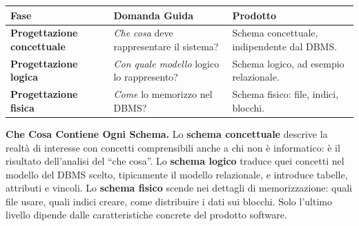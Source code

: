 \documentclass[12pt]{extarticle}
\begin{document}
\begin{center}
\small
\begin{tabular}{@{}L{5.3cm}L{4.7cm}L{4.55cm}@{}}
    \toprule
    \textbf{Fase} & \textbf{Domanda Guida} & \textbf{Prodotto} \\
    \midrule
    \textbf{Progettazione concettuale} & \textit{Che cosa} deve rappresentare il sistema? & Schema concettuale, indipendente dal DBMS. \\
    \addlinespace
    \textbf{Progettazione logica} & \textit{Con quale modello} logico lo rappresento? & Schema logico, ad esempio relazionale. \\
    \addlinespace
    \textbf{Progettazione fisica} & \textit{Come} lo memorizzo nel DBMS? & Schema fisico: file, indici, blocchi. \\
    \bottomrule
\end{tabular}
\end{center}

\begin{center}
\begin{adjustbox}{max width=\linewidth}
\end{adjustbox}
\end{center}

\medskip
\noindent \textbf{Che Cosa Contiene Ogni Schema.} Lo \textbf{schema concettuale} descrive la realtà di interesse con concetti comprensibili anche a chi non è informatico: è il risultato dell'analisi del ``che cosa''. Lo \textbf{schema logico} traduce quei concetti nel modello del DBMS scelto, tipicamente il modello relazionale, e introduce tabelle, attributi e vincoli. Lo \textbf{schema fisico} scende nei dettagli di memorizzazione: quali file usare, quali indici creare, come distribuire i dati sui blocchi. Solo l'ultimo livello dipende dalle caratteristiche concrete del prodotto software.
\end{document}
